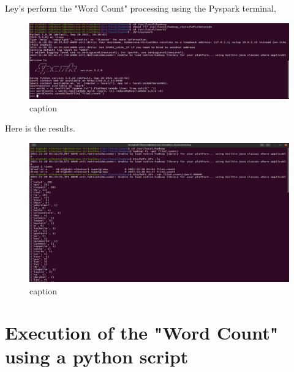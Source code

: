 \begin{spacing}{1.2}
\par Ley's perform the "Word Count" processing using the Pyspark terminal,
\\
\begin{figure}[!htb] 
\begin{center} 
\includegraphics[width=1\linewidth]{Big_Data/Spark/Executing WCount using scala/WCout using pyspark.jpg} 
\end{center} 
\caption{caption} 
\end{figure} 
\FloatBarrier



\par Here is the results.
\\
\begin{figure}[!htb] 
\begin{center} 
\includegraphics[width=1\linewidth]{Big_Data/Spark/Executing WCount using scala/WCout using pyspark Results.jpg} 
\end{center} 
\caption{caption} 
\end{figure} 
\FloatBarrier

\section{Execution of the "Word Count" using a python script}


\end{spacing}
